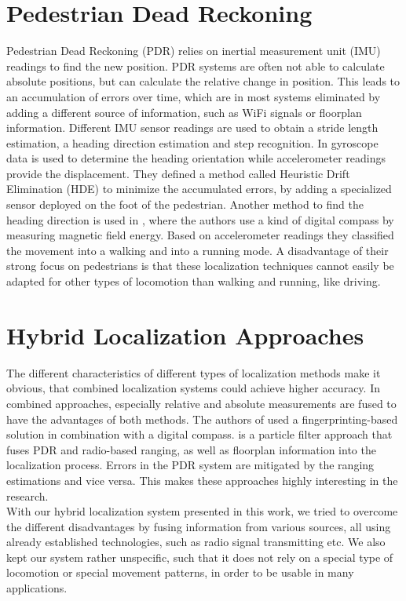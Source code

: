 \section{Pedestrian Dead Reckoning}
Pedestrian Dead Reckoning (PDR) relies on inertial measurement unit (IMU) readings to find the new position. PDR systems are often not able to calculate absolute positions, but can calculate the relative change in position. This leads to an accumulation of errors over time, which are in most systems eliminated by adding a different source of information, such as WiFi signals or floorplan information. Different IMU sensor readings are used to obtain a stride length estimation, a heading direction estimation and step recognition. In \cite{Borestein} gyroscope data is used to determine the heading orientation while accelerometer readings provide the displacement. They defined a method called Heuristic Drift Elimination (HDE) to minimize the accumulated errors, by adding a specialized sensor deployed on the foot of the pedestrian. Another method to find the heading direction is used in \cite{Kakiuchi}, where the authors use a kind of digital compass by measuring magnetic field energy. Based on accelerometer readings they classified the movement into a walking and into a running mode. A disadvantage of their strong focus on pedestrians is that these localization techniques cannot easily be adapted for other types of locomotion than walking and running, like driving.  

\section{Hybrid Localization Approaches}
The different characteristics of different types of localization methods make it obvious, that combined localization systems could achieve higher accuracy. In combined approaches, especially relative and absolute measurements are fused to have the advantages of both methods. The authors of \cite{Nagpal} used a fingerprinting-based solution in combination with a digital compass. \cite{Carrera} is a particle filter approach that fuses PDR and radio-based ranging, as well as floorplan information into the localization process. Errors in the PDR system are mitigated by the ranging estimations and vice versa. This makes these approaches highly interesting in the research.\\
\noindent\hspace*{5mm}%
With our hybrid localization system presented in this work, we tried to overcome the different disadvantages by fusing information from various sources, all using already established technologies, such as radio signal transmitting etc. We also kept our system rather unspecific, such that it does not rely on a special type of locomotion or special movement patterns, in order to be usable in many applications.